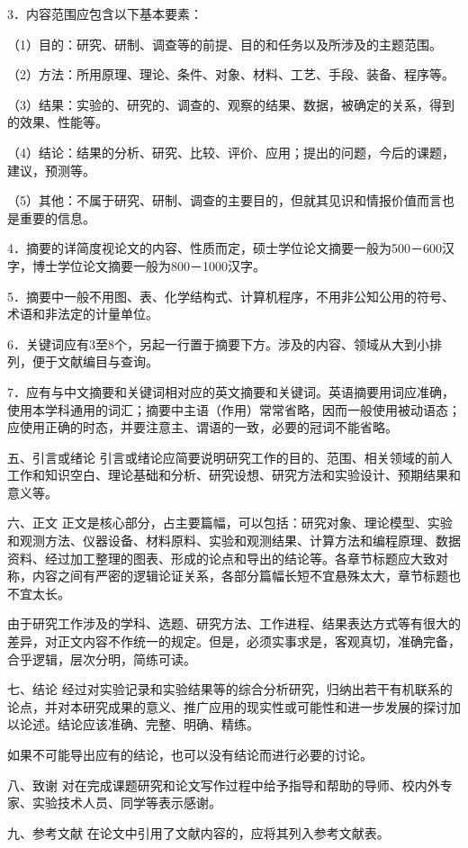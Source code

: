 3．内容范围应包含以下基本要素：

（1）目的：研究、研制、调查等的前提、目的和任务以及所涉及的主题范围。

（2）方法：所用原理、理论、条件、对象、材料、工艺、手段、装备、程序等。

（3）结果：实验的、研究的、调查的、观察的结果、数据，被确定的关系，得到的效果、性能等。

（4）结论：结果的分析、研究、比较、评价、应用；提出的问题，今后的课题，建议，预测等。

（5）其他：不属于研究、研制、调查的主要目的，但就其见识和情报价值而言也是重要的信息。

4．摘要的详简度视论文的内容、性质而定，硕士学位论文摘要一般为500－600汉字，博士学位论文摘要一般为800－1000汉字。

5．摘要中一般不用图、表、化学结构式、计算机程序，不用非公知公用的符号、术语和非法定的计量单位。

6．关键词应有3至8个，另起一行置于摘要下方。涉及的内容、领域从大到小排列，便于文献编目与查询。

7．应有与中文摘要和关键词相对应的英文摘要和关键词。英语摘要用词应准确，使用本学科通用的词汇；摘要中主语（作用）常常省略，因而一般使用被动语态；应使用正确的时态，并要注意主、谓语的一致，必要的冠词不能省略。

五、引言或绪论
引言或绪论应简要说明研究工作的目的、范围、相关领域的前人工作和知识空白、理论基础和分析、研究设想、研究方法和实验设计、预期结果和意义等。

六、正文
正文是核心部分，占主要篇幅，可以包括：研究对象、理论模型、实验和观测方法、仪器设备、材料原料、实验和观测结果、计算方法和编程原理、数据资料、经过加工整理的图表、形成的论点和导出的结论等。各章节标题应大致对称，内容之间有严密的逻辑论证关系，各部分篇幅长短不宜悬殊太大，章节标题也不宜太长。

由于研究工作涉及的学科、选题、研究方法、工作进程、结果表达方式等有很大的差异，对正文内容不作统一的规定。但是，必须实事求是，客观真切，准确完备，合乎逻辑，层次分明，简练可读。

七、结论
经过对实验记录和实验结果等的综合分析研究，归纳出若干有机联系的论点，并对本研究成果的意义、推广应用的现实性或可能性和进一步发展的探讨加以论述。结论应该准确、完整、明确、精练。

如果不可能导出应有的结论，也可以没有结论而进行必要的讨论。

八、致谢
对在完成课题研究和论文写作过程中给予指导和帮助的导师、校内外专家、实验技术人员、同学等表示感谢。

九、参考文献
在论文中引用了文献内容的，应将其列入参考文献表。

